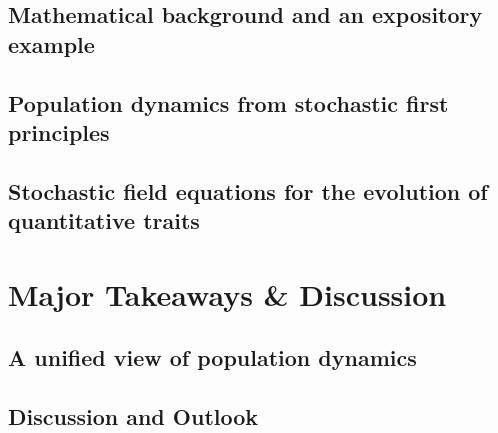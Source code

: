 \documentclass[twoside,12pt]{iiser-thesis-modified} %
\begin{document}
\chapter{Mathematical background and an expository example}\label{chap_math_background}


\chapter{Population dynamics from stochastic first principles}\label{chap_BD}


\chapter{Stochastic field equations for the evolution of quantitative traits}\label{chap_infD_processes}


\cleardoublepage
\begingroup
\makeatletter
\let\ps@plain\ps@empty
\part{Major Takeaways \& Discussion}\label{part_summary}
\endgroup

\chapter{A unified view of population dynamics}\label{chap_unification}


\chapter{Discussion and Outlook}\label{sec_disc}


\clearpage
\null\thispagestyle{plain}\newpage
\ifodd\value{page}\else\null\thispagestyle{plain}\newpage\fi

\cleardoublepage
{}
\appendix
{}

\renewcommand{\chaptername}{Appendix}
\end{document}
